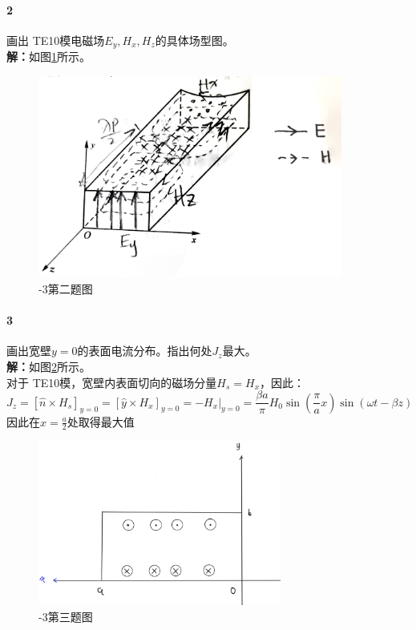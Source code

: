     \paragraph{2}画出 TE{\scriptsize 10}模电磁场$E_y, H_x, H_z$的具体场型图。
    \\{\bfseries 解：}如图\ref{Fig: 2-3(2)}所示。\\
    \begin{figure}[htp]
        \centering
        \includegraphics[width=10cm]{figure/appendix/2-3(2).jpg}
        \caption{-3第二题图}\label{Fig: 2-3(2)}
    \end{figure}
    \paragraph{3}画出宽壁$y=0$的表面电流分布。指出何处$J_z$最大。
    \\{\bfseries 解：}如图\ref{Fig: 2-3(3)}所示。\\
    对于 TE{\scriptsize 10}模，宽壁内表面切向的磁场分量$H_s=H_x$，因此：
    \begin{equation*}
        J_z=\left[\hat{n}\times H_s\right]_{y=0}=\left[\hat{y}\times H_x\right]_{y=0}=-H_x|_{y=0}=\frac{\beta a}{\pi}H_0\sin\left(\frac{\pi}{a}x\right)\sin(\omega t-\beta z)
    \end{equation*}
    因此在$x=\frac{a}{2}$处取得最大值
    \begin{figure}[htp]
        \centering
        \includegraphics[width=8cm]{figure/appendix/2-3(3).jpg}
        \caption{-3第三题图}\label{Fig: 2-3(3)}
    \end{figure}

